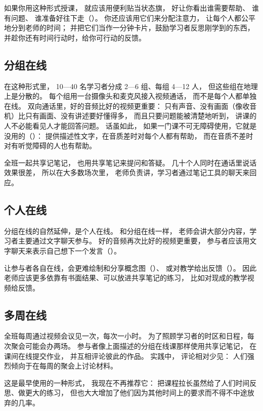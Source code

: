 如果你用这种形式授课，
就应该用便利贴当状态旗，
好让你看出谁需要帮助、
谁有问题、
谁准备好往下走（）。
你还应该用它们来分配注意力，
让每个人都公平地分到老师的时间；
并把它们当作一分钟卡片，鼓励学习者反思刚学到的东西，
并趁你还有时间行动时，给你可行动的反馈。

\subsection*{分组在线}

在这种形式里，
10—40 名学习者分成 2—6 组、每组 4—12 人，
但这些组在地理上是分散的。
每个组用一台摄像头和麦克风接入视频通话，
而不是每个人都单独在线。
双向通话里，好的音频比好的视频更重要：
只有声音、没有画面（像收音机）比只有画面、没有讲述要好懂得多，
而且只要问题能被清楚地听到，
讲课的人不必能看见人才能回答问题。
话虽如此，
如果一门课不可无障碍使用，它就是没用的（）：
提供描述性文字，在音质差时对每个人都有帮助，
而在音质不差时对有听觉障碍的人也有帮助。

全班一起共享记笔记，
也用共享笔记来提问和答疑。
几十个人同时在通话里说话效果很差，
所以在大多数场次里，
老师负责讲，学习者通过笔记工具的聊天来回应。

\subsection*{个人在线}

分组在线的自然延伸，是个人在线。
和分组在线一样，
老师会讲大部分内容，学习者主要通过文字聊天参与。
好的音频再次比好的视频更重要，
参与者应该用文字聊天来表示自己想下一个发言（）。

让参与者各自在线，会更难绘制和分享概念图（）、
或对教学给出反馈（）。
因此老师应该更多依靠有书面结果、可以放进共享笔记的练习，
比如对现成的教学视频给反馈。

\subsection*{多周在线}

全班每周通过视频会议见一次，每次一小时。
为了照顾学习者的时区和日程，每次聚会可能会办两场。
参与者像上面描述的分组在线课那样使用共享记笔记，
在课间在线提交作业，
并互相评论彼此的作品。
实践中，
评论相对少见：
人们强烈倾向于在每周的聚会上讨论材料。

这是最早使用的一种形式，
我现在不再推荐它：
把课程拉长虽然给了人们时间反思、做更大的练习，
但也大大增加了他们因为其他时间上的要求而不得不中途放弃的几率。

